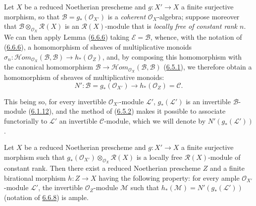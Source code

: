 \begin{env}[6.6.8]
\label{II.6.6.8}
Let $X$ be a reduced Noetherian prescheme and $g:X'\to X$ a finite
surjective morphism, so that $\mathcal{B}=g_*(\mathcal{O}_{X'})$ is a
\emph{coherent} $\mathcal{O}_X$-algebra; suppose moreover that
$\mathcal{B}\otimes_{\mathcal{O}_X}\mathcal{R}(X)$ is an
$\mathcal{R}(X)$-module that is \emph{locally free of constant rank $n$}. We
can then apply Lemma (\hyperref[II.6.6.6]{6.6.6}) taking
$\mathcal{E}=\mathcal{B}$, whence, with the notation of
(\hyperref[II.6.6.6]{6.6.6}), a homomorphism of sheaves of multiplicative
monoids
$\sigma_n:\mathcal{H}om_{\mathcal{O}_X}(\mathcal{B},\mathcal{B})
\to h_*(\mathcal{O}_Z)$, and, by composing this homomorphism with
the canonical homomorphism
$\mathcal{B}\to
\mathcal{H}om_{\mathcal{O}_X}(\mathcal{B},\mathcal{B})$
(\hyperref[II.6.5.1]{6.5.1}), we therefore obtain a homomorphism of
sheaves of multiplicative monoids:
\[
\label{II.6.6.8.1}
N':\mathcal{B}=g_*(\mathcal{O}_{X'})\longrightarrow
h_*(\mathcal{O}_Z)=\mathcal{C}.
\tag{6.6.8.1}
\]

This being so, for every invertible $\mathcal{O}_{X'}$-module $\mathcal{L}'$,
$g_*(\mathcal{L}')$ is an invertible $\mathcal{B}$-module
(\hyperref[II.6.1.12]{6.1.12}), and the method of
(\hyperref[II.6.5.2]{6.5.2}) makes it possible to associate functorially to
$\mathcal{L}'$ an invertible $\mathcal{C}$-module, which we will denote by
$N'(g_*(\mathcal{L}'))$.
\end{env}

\begin{lemma}[6.6.9]
\label{II.6.6.9}
Let $X$ be a reduced Noetherian prescheme and $g:X'\to X$ a finite
surjective morphism such that
$g_*(\mathcal{O}_{X'})\otimes_{\mathcal{O}_X}\mathcal{R}(X)$ is a
locally free $\mathcal{R}(X)$-module of constant rank. Then there exist
a reduced Noetherian prescheme $Z$ and a finite birational morphism
$h:Z\to X$ having the following property: for every ample
$\mathcal{O}_{X'}$-module $\mathcal{L}'$, the invertible
$\mathcal{O}_Z$-module $\mathcal{M}$ such that
$h_*(\mathcal{M})=N'(g_*(\mathcal{L}'))$ (notation of
\hyperref[II.6.6.8]{6.6.8}) is ample.
\end{lemma}


